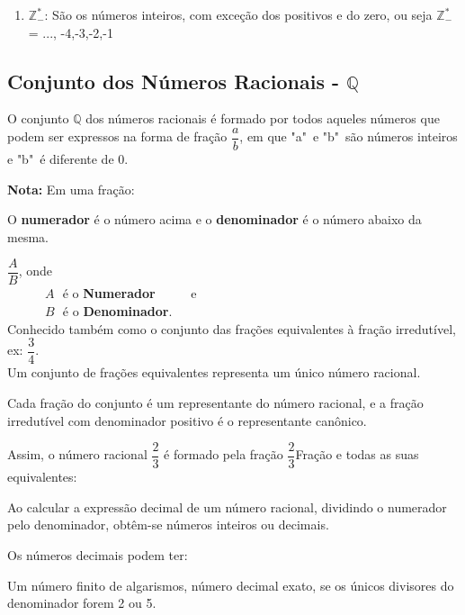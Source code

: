 \begin{multicols*}{2}
\begin{enumerate}
        \item $\mathbb{Z}^*_-$: São os números inteiros, com exceção dos positivos e do zero, ou seja $\mathbb{Z}^*_- $= {..., -4,-3,-2,-1}

    \end{enumerate}

    \subsection{Conjunto dos Números Racionais - $\mathbb{Q}$}

    O conjunto $\mathbb{Q} $ dos números racionais é formado por todos aqueles números que podem ser expressos na forma de fração $\dfrac{a}{b}$, em que "a"\ e "b"\ são números inteiros e "b"\ é diferente de 0.

    \textbf{Nota:} Em uma fração:

    O \textbf{numerador} é o número acima e o \textbf{denominador} é o número abaixo da mesma.

    $ \dfrac{A}{B} $, onde\\

    $\, \, \, \, \, \, \, \, \, \, \, \, \, \, \, \, \, \,A \, \, $ é o \textbf{Numerador} $\, \, \, \, \, \, \, \, \, \, \, \, \, $ e\\

    $\, \, \, \, \, \, \, \, \, \, \, \, \, \, \, \, \, \,B \, \, $ é o \textbf{Denominador}.\\

    Conhecido também como o conjunto das frações equivalentes à fração irredutível, ex: $\dfrac{3}{4}$.\\

    Um conjunto de frações equivalentes representa um único número racional.

    Cada fração do conjunto é um representante do número racional, e a fração irredutível com denominador positivo é o representante canônico.

    Assim, o número racional $\dfrac{2}{3} $ é formado pela fração $\dfrac{2}{3} $Fração e todas as suas equivalentes:

    Ao calcular a expressão decimal de um número racional, dividindo o numerador pelo denominador, obtêm-se números inteiros ou decimais.

    Os números decimais podem ter:

    Um número finito de algarismos, número decimal exato, se os únicos divisores do denominador forem 2 ou 5.


\end{multicols*}
